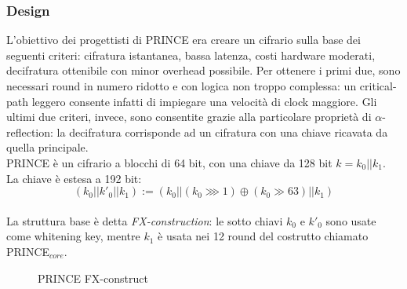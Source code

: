 \documentclass[target=bach,aauheader=,style=]{thud}
\begin{document}
			\subsubsection{Design}
			L'obiettivo dei progettisti di PRINCE era creare un cifrario sulla base dei seguenti criteri: cifratura istantanea, bassa latenza, costi hardware moderati, decifratura ottenibile con minor overhead possibile.
			Per ottenere i primi due, sono necessari round in numero ridotto e con logica non troppo complessa: un critical-path leggero consente infatti di impiegare una velocità di clock maggiore.
			Gli ultimi due criteri, invece, sono consentite grazie alla particolare proprietà di $\alpha$-reflection: la decifratura corrisponde ad un cifratura con una chiave ricavata da quella principale.\\
			PRINCE è un cifrario a blocchi di 64 bit, con una chiave da 128 bit $k = k_0 || k_1$. La chiave è estesa a 192 bit:
			\[(k_0||k'_0||k_1) := (k_0 || (k_0 \ggg 1) \oplus (k_0 \gg 63) || k_1)\]\\
			La struttura base è detta \textit{FX-construction}: le sotto chiavi $k_0$ e $k'_0$ sono usate come whitening key, mentre $k_1$ è usata nei 12 round del costrutto chiamato PRINCE$_{core}$.
			\begin{figure}[h!]
				\centering
				\caption{PRINCE FX-construct}
				\label{fig:princefx}
			\end{figure}
			
\end{document}
